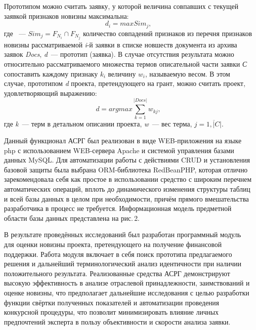 Прототипом можно считать заявку, у которой величина совпавших с текущей заявкой признаков новизны максимальна:
\begin{equation}
  d_i = max Sim_j,
\end{equation}
где ~--- $Sim_j = F_{N_i} \cap F_{N_j}$ количество совпадений признаков из перечня признаков новизны рассматриваемой \textit{i}-й заявки в списке новшеств документа из архива заявок \textit{Docs}, \textit{d}~--- прототип (заявка). В случае отсутствия результата можно относительно рассматриваемого множества термов описательной части заявки \textit{С} сопоставить каждому признаку $k_i$ величину $w_i$, называемую весом. В этом случае, прототипом \textit{d} проекта, претендующего на грант, можно считать проект, удовлетворяющий выражению:
\begin{equation}
  d = argmax \sum_{k=1}^{|Docs|}w_{kj},
\end{equation}
где \textit{k}~--- терм в детальном описании проекта, \textit{w}~--- вес терма, $j=\overline{1,|C|}$.

Данный функционал АСРГ был реализован в виде WEB-приложения на языке php с использованием WEB-сервера Apache и системой управления базами данных MySQL. Для автоматизации работы с действиями CRUD и установления базовой защиты была выбрана ORM-библиотека RedBeanPHP, которая отлично зарекомендовала себя как простое в использовании средство с широким перечнем автоматических операций, вплоть до динамического изменения структуры таблиц и всей базы данных в целом при необходимости, причём прямого вмешательства разработчика в процесс не требуется. Информационная модель предметной области базы данных представлена на рис.\,2.

В результате проведённых исследований был разработан программный модуль для оценки новизны проекта, претендующего на получение финансовой поддержки. Работа модуля включает в себя поиск прототипа предлагаемого решения и дальнейший терминологический анализ идентичности при наличии положительного результата. Реализованные средства АСРГ демонстрируют высокую эффективность в анализе отраслевой принадлежности, заимствований и оценке новизны, что предполагает дальнейшие исследования с целью разработки функции свёртки полученных показателей и автоматизации проведения конкурсной процедуры, что позволит минимизировать влияние личных предпочтений эксперта в пользу объективности и скорости анализа заявки.


